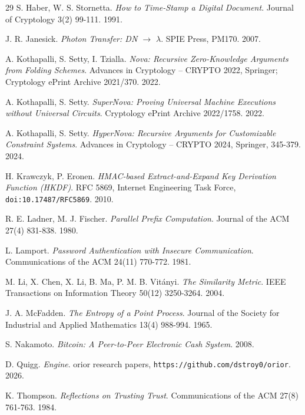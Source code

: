 \begin{thebibliography}{29}
S. Haber, W. S. Stornetta. \emph{How to Time-Stamp a Digital Document}. Journal of Cryptology 3(2) 99-111. 1991.

J. R. Janesick. \emph{Photon Transfer: DN \(\to\) \(\lambda\)}. SPIE Press, PM170. 2007.

A. Kothapalli, S. Setty, I. Tzialla. \emph{Nova: Recursive Zero-Knowledge Arguments from Folding Schemes}. Advances in Cryptology -- CRYPTO 2022, Springer; Cryptology ePrint Archive 2021/370. 2022.

A. Kothapalli, S. Setty. \emph{SuperNova: Proving Universal Machine Executions without Universal Circuits}. Cryptology ePrint Archive 2022/1758. 2022.

A. Kothapalli, S. Setty. \emph{HyperNova: Recursive Arguments for Customizable Constraint Systems}. Advances in Cryptology -- CRYPTO 2024, Springer, 345-379. 2024.

H. Krawczyk, P. Eronen. \emph{HMAC-based Extract-and-Expand Key Derivation Function (HKDF)}. RFC 5869, Internet Engineering Task Force, \texttt{doi:10.17487/\allowbreak{}RFC5869}. 2010.

R. E. Ladner, M. J. Fischer. \emph{Parallel Prefix Computation}. Journal of the ACM 27(4) 831-838. 1980.

L. Lamport. \emph{Password Authentication with Insecure Communication}. Communications of the ACM 24(11) 770-772. 1981.

M. Li, X. Chen, X. Li, B. Ma, P. M. B. Vit\'anyi. \emph{The Similarity Metric}. IEEE Transactions on Information Theory 50(12) 3250-3264. 2004.

J. A. McFadden. \emph{The Entropy of a Point Process}. Journal of the Society for Industrial and Applied Mathematics 13(4) 988-994. 1965.

S. Nakamoto. \emph{Bitcoin: A Peer-to-Peer Electronic Cash System}. 2008.

D. Quigg. \emph{Engine}. orior research papers, \texttt{https:/\allowbreak{}/\allowbreak{}github.com/\allowbreak{}dstroy0/\allowbreak{}orior}. 2026.

K. Thompson. \emph{Reflections on Trusting Trust}. Communications of the ACM 27(8) 761-763. 1984.


\end{thebibliography}
